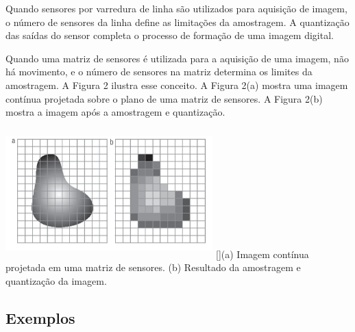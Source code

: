 \documentclass[a4paper,11pt]{article}
\newenvironment{Figure}
  {\par\medskip\noindent\minipage{\linewidth}}
    {\endminipage\par\medskip}
\begin{document}
\begin{multicols}{2}
\par
Quando sensores por varredura de linha são utilizados para aquisição de imagem, o número de sensores da linha define as limitações da amostragem. A quantização das saídas do sensor completa o processo de formação de uma imagem digital.
\par 
Quando uma matriz de sensores é utilizada para a aquisição de uma imagem, não há movimento, e o número de sensores na matriz determina os limites da amostragem. A Figura 2 ilustra esse conceito. A Figura 2(a) mostra uma imagem contínua projetada sobre o plano de uma matriz de sensores. A Figura 2(b) mostra a imagem após a amostragem e quantização.
\begin{Figure}
	\centering 
	\includegraphics[width=8cm, height=5cm]{figura2}
	[]{(a) Imagem contínua projetada em uma matriz de sensores. (b) Resultado da amostragem e quantização da imagem.}
	\label{medium}
\end{Figure}

\subsection{Exemplos}

\end{multicols}
\end{document}
